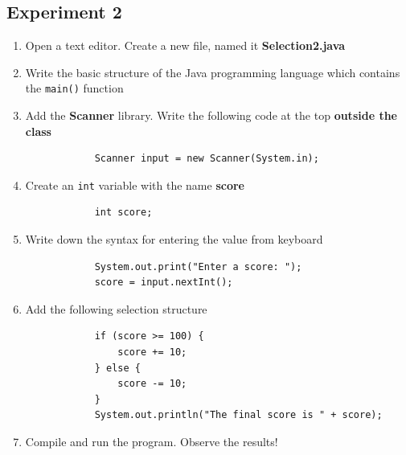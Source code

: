 \documentclass[12pt,titlepage]{article}
\begin{document}
\subsection{Experiment 2}
\begin{enumerate}
    \item Open a text editor. Create a new file, named it \textbf{Selection2.java}
    \item Write the basic structure of the Java programming language which contains the \texttt{main()} function
    \item {
        Add the \textbf{Scanner} library. Write the following code at the top \textbf{outside the class}

        \begin{verbatim}
            Scanner input = new Scanner(System.in);
        \end{verbatim}
    }
    \item {
        Create an \texttt{int} variable with the name \textbf{score}

        \begin{verbatim}
            int score;
        \end{verbatim}
    }
    \item {
        Write down the syntax for entering the value from keyboard

        \begin{verbatim}
            System.out.print("Enter a score: ");
            score = input.nextInt();
        \end{verbatim}
    }
    \item {
        Add the following selection structure

        \begin{verbatim}
            if (score >= 100) {
                score += 10;
            } else {
                score -= 10;
            }
            System.out.println("The final score is " + score);
        \end{verbatim}
    }
    \pagebreak
    \item {
        Compile and run the program. Observe the results!

}
\end{enumerate}
\end{document}
